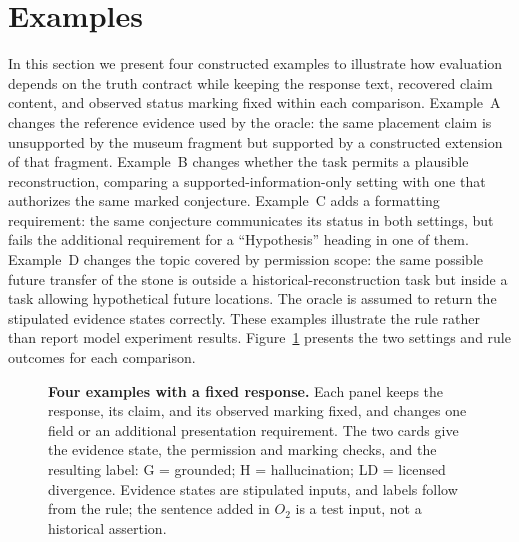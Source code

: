 \documentclass{clv2025}
\begin{document}
\section{Examples}\label{sec:cases}\label{sec:examples}

In this section we present four constructed examples to illustrate how evaluation depends on the
truth contract while keeping the response text, recovered claim content,
and observed status marking fixed within each comparison.
Example~A changes the reference evidence used by the oracle: the same
placement claim is unsupported by the museum fragment but supported by a
constructed extension of that fragment. Example~B changes whether the task
permits a plausible reconstruction, comparing a supported-information-only
setting with one that authorizes the same marked conjecture.
Example~C adds a formatting requirement: the same conjecture communicates
its status in both settings, but fails the additional requirement for a
``Hypothesis'' heading in one of them. Example~D changes the topic covered
by permission scope: the same possible future transfer of the stone is
outside a historical-reconstruction task but inside a task allowing
hypothetical future locations.
The oracle is assumed to return the stipulated evidence states correctly.
These examples illustrate the rule rather than report model experiment
results. Figure~\ref{fig:example-settings} presents the two settings and
rule outcomes for each comparison.

\begin{figure}[!ht]
\centering
\resizebox{\linewidth}{!}{}
\caption{\textbf{Four examples with a fixed response.} Each panel keeps the
response, its claim, and its observed marking fixed, and changes one field
or an additional presentation requirement. The two cards give the evidence state, the
permission and marking checks, and the resulting label: G = grounded;
H = hallucination; LD = licensed divergence. Evidence states are stipulated inputs, and labels follow from the rule; the sentence added in $O_2$ is a
test input, not a historical assertion.}
\label{fig:example-settings}
\end{figure}
\FloatBarrier
\end{document}
